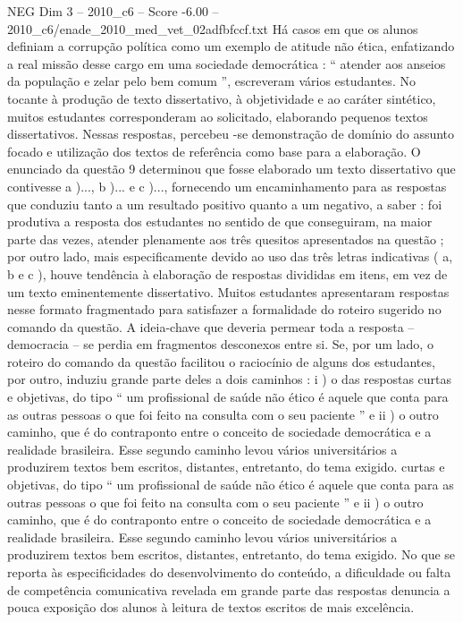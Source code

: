 \begin{textsample}{NEG Dim 3 – 2010\_c6 – Score -6.00 – 2010\_c6/enade\_2010\_med\_vet\_02adfbfccf.txt}
Há casos em que os alunos definiam a corrupção política como um exemplo de atitude não ética, enfatizando a real missão desse cargo em uma sociedade democrática : “ atender aos anseios da população e zelar pelo bem comum ”, escreveram vários estudantes.
No tocante à produção de texto dissertativo, à objetividade e ao caráter sintético, muitos estudantes corresponderam ao solicitado, elaborando pequenos textos dissertativos.
Nessas respostas, percebeu -se demonstração de domínio do assunto focado e utilização dos textos de referência como base para a elaboração.
O enunciado da questão 9 determinou que fosse elaborado um texto dissertativo que contivesse a )..., b )... e c )..., fornecendo um encaminhamento para as respostas que conduziu tanto a um resultado positivo quanto a um negativo, a saber : foi produtiva a resposta dos estudantes no sentido de que conseguiram, na maior parte das vezes, atender plenamente aos três quesitos apresentados na questão ; por outro lado, mais especificamente devido ao uso das três letras indicativas ( a, b e c ), houve tendência à elaboração de respostas divididas em itens, em vez de um texto eminentemente dissertativo.
Muitos estudantes apresentaram respostas nesse formato fragmentado para satisfazer a formalidade do roteiro sugerido no comando da questão.
A ideia-chave que deveria permear toda a resposta – democracia – se perdia em fragmentos desconexos entre si.
Se, por um lado, o roteiro do comando da questão facilitou o raciocínio de alguns dos estudantes, por outro, induziu grande parte deles a dois caminhos : i ) o das respostas curtas e objetivas, do tipo “ um profissional de saúde não ético é aquele que conta para as outras pessoas o que foi feito na consulta com o seu paciente ” e ii ) o outro caminho, que é do contraponto entre o conceito de sociedade democrática e a realidade brasileira.
Esse segundo caminho levou vários universitários a produzirem textos bem escritos, distantes, entretanto, do tema exigido. curtas e objetivas, do tipo “ um profissional de saúde não ético é aquele que conta para as outras pessoas o que foi feito na consulta com o seu paciente ” e ii ) o outro caminho, que é do contraponto entre o conceito de sociedade democrática e a realidade brasileira.
Esse segundo caminho levou vários universitários a produzirem textos bem escritos, distantes, entretanto, do tema exigido.
No que se reporta às especificidades do desenvolvimento do conteúdo, a dificuldade ou falta de competência comunicativa revelada em grande parte das respostas denuncia a pouca exposição dos alunos à leitura de textos escritos de mais excelência.

\end{textsample}
